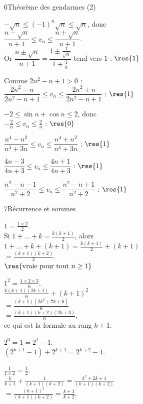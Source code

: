 \begin{deuxcolonnes}
\begin{corrige}{6}{Théorème des gendarmes (2)}
\begin{questions}
  \item $-\sqrt{n}\leq(-1)^{n}\sqrt{n}\leq\sqrt{n}$, donc\\
    $\dfrac{n-\sqrt{n}}{n+1}\leq v_n\leq\dfrac{n+\sqrt{n}}{n+1}$.\\
    Or $\dfrac{n\pm\sqrt{n}}{n+1}=\dfrac{1\pm\frac{1}{\sqrt{n}}}{1+\frac{1}{n}}$ tend vers $1$ : $\res{1}$
  \item Comme $2n^{2}-n+1>0$ :\\
    $\dfrac{2n^{2}-n}{2n^{2}-n+1}\leq v_n\leq\dfrac{2n^{2}+n}{2n^{2}-n+1}$ : $\res{1}$
  \item $-2\leq\sin n+\cos n\leq2$, donc\\ $-\frac{2}{n}\leq v_n\leq\frac{2}{n}$ : $\res{0}$
  \item $\dfrac{n^{4}-n^{2}}{n^{4}+3n}\leq v_n\leq\dfrac{n^{4}+n^{2}}{n^{4}+3n}$ : $\res{1}$
  \item $\dfrac{4n-3}{4n+3}\leq v_n\leq\dfrac{4n+1}{4n+3}$ : $\res{1}$
  \item $\dfrac{n^{2}-n-1}{n^{2}+2}\leq v_n\leq\dfrac{n^{2}-n+1}{n^{2}+2}$ : $\res{1}$
\end{questions}
\end{corrige}

\begin{corrige}{7}{Récurrence et sommes}
\begin{questions}
  \item {} $1=\frac{1\times2}{2}$.\\
     Si $1+\dots+k=\frac{k(k+1)}{2}$, alors\\
    $1+\dots+k+(k+1)=\frac{k(k+1)}{2}+(k+1)$\\
    $=\frac{(k+1)(k+2)}{2}$.\\
     $\res{\text{vraie pour tout }n\geq1}$
  \item {} $1^{2}=\frac{1\times2\times3}{6}$.\\
     $\frac{k(k+1)(2k+1)}{6}+(k+1)^{2}$\\
    $=\frac{(k+1)\left(2k^{2}+7k+6\right)}{6}$\\
    $=\frac{(k+1)(k+2)(2k+3)}{6}$,\\
    ce qui est la formule au rang $k+1$.
  \item {} $2^{0}=1=2^{1}-1$.\\
     $\left(2^{k+1}-1\right)+2^{k+1}=2^{k+2}-1$.
  \item {} $\frac{1}{1\times2}=\frac12$.\\
     $\frac{k}{k+1}+\frac{1}{(k+1)(k+2)}=\frac{k^{2}+2k+1}{(k+1)(k+2)}$\\
    $=\frac{(k+1)^{2}}{(k+1)(k+2)}=\frac{k+1}{k+2}$.
\end{questions}
\end{corrige}


\end{deuxcolonnes}
